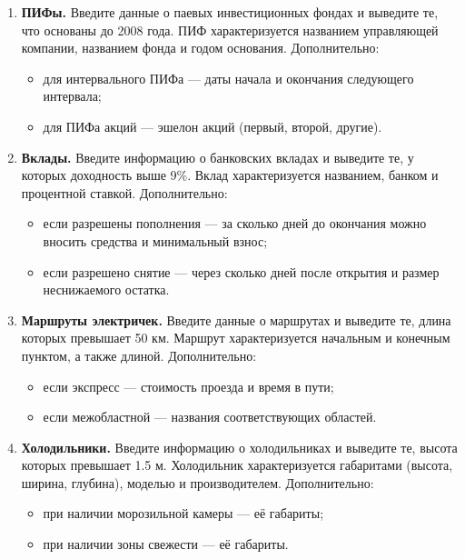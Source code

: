 \begin{enumerate}
    \item \textbf{ПИФы.}  
    Введите данные о паевых инвестиционных фондах и выведите те, что основаны до 2008 года.  
    ПИФ характеризуется названием управляющей компании, названием фонда и годом основания.  
    Дополнительно:
    \begin{itemize}
        \item для интервального ПИФа — даты начала и окончания следующего интервала;
        \item для ПИФа акций — эшелон акций (первый, второй, другие).
    \end{itemize}

    \item \textbf{Вклады.}  
    Введите информацию о банковских вкладах и выведите те, у которых доходность выше 9\%.  
    Вклад характеризуется названием, банком и процентной ставкой.  
    Дополнительно:
    \begin{itemize}
        \item если разрешены пополнения — за сколько дней до окончания можно вносить средства и минимальный взнос;
        \item если разрешено снятие — через сколько дней после открытия и размер неснижаемого остатка.
    \end{itemize}

    \item \textbf{Маршруты электричек.}  
    Введите данные о маршрутах и выведите те, длина которых превышает 50 км.  
    Маршрут характеризуется начальным и конечным пунктом, а также длиной.  
    Дополнительно:
    \begin{itemize}
        \item если экспресс — стоимость проезда и время в пути;
        \item если межобластной — названия соответствующих областей.
    \end{itemize}

    \item \textbf{Холодильники.}  
    Введите информацию о холодильниках и выведите те, высота которых превышает 1.5 м.  
    Холодильник характеризуется габаритами (высота, ширина, глубина), моделью и производителем.  
    Дополнительно:
    \begin{itemize}
        \item при наличии морозильной камеры — её габариты;
        \item при наличии зоны свежести — её габариты.
    \end{itemize}


\end{enumerate}
